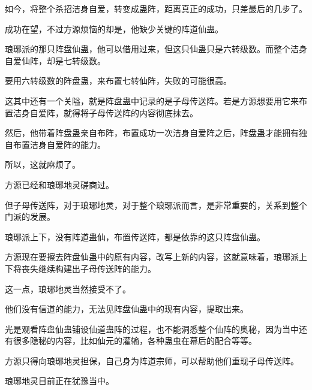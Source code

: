 \begin{this_body}
如今，将整个杀招洁身自爱，转变成蛊阵，距离真正的成功，只差最后的几步了。

成功在望，不过方源烦恼的却是，他缺少关键的阵道仙蛊。

琅琊派的那只阵盘仙蛊，他可以借用过来，但这只仙蛊只是六转级数。而整个洁身自爱仙阵，却是七转级数。

要用六转级数的阵盘蛊，来布置七转仙阵，失败的可能很高。

这其中还有一个关隘，就是阵盘蛊中记录的是子母传送阵。若是方源想要用它来布置洁身自爱阵，就得将子母传送阵的内容彻底抹去。

然后，他带着阵盘蛊亲自布阵，布置成功一次洁身自爱阵之后，阵盘蛊才能拥有独自布置洁身自爱阵的能力。

所以，这就麻烦了。

方源已经和琅琊地灵磋商过。

但子母传送阵，对于琅琊地灵，对于整个琅琊派而言，是非常重要的，关系到整个门派的发展。

琅琊派上下，没有阵道蛊仙，布置传送阵，都是依靠的这只阵盘仙蛊。

方源现在要擦去阵盘仙蛊中的原有内容，改写上新的内容，这就意味着，琅琊派上下将丧失继续构建出子母传送阵的能力。

这一点，琅琊地灵当然接受不了。

他们没有信道的能力，无法见阵盘仙蛊中的现有内容，提取出来。

光是观看阵盘仙蛊铺设仙道蛊阵的过程，也不能洞悉整个仙阵的奥秘，因为当中还有很多隐秘的内容，比如仙元的灌输，各种蛊虫在幕后的配合等等。

方源只得向琅琊地灵担保，自己身为阵道宗师，可以帮助他们重现子母传送阵。

琅琊地灵目前正在犹豫当中。

\end{this_body}

